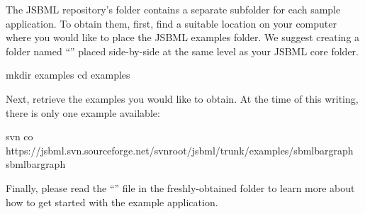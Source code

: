 The JSBML repository's  folder contains a separate
subfolder for each sample application.  To obtain them, first, find a
suitable location on your computer where you would like to place the JSBML
examples folder.  We suggest creating a folder named ``''
placed side-by-side at the same level as your JSBML core folder.

\begin{example}[style=bash, title={Creating a folder for the examples.}]
mkdir examples
cd examples
\end{example}

Next, retrieve the examples you would like to obtain.  At the time of this
writing, there is only one example available:

\begin{example}[style=bash, title={Retrieving the \emph{SBML Bar Graph}
    example application.}] 
svn co https://jsbml.svn.sourceforge.net/svnroot/jsbml/trunk/examples/sbmlbargraph sbmlbargraph
\end{example}

Finally, please read the ``'' file in the freshly-obtained
 folder to learn more about how to get started with the
example application.






